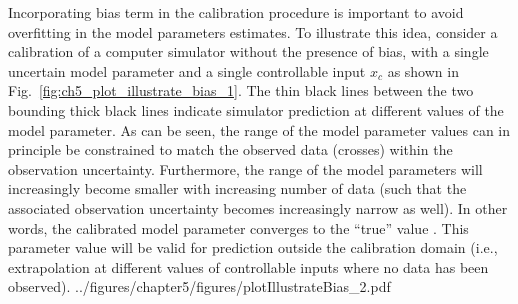 Incorporating bias term in the calibration procedure is important to avoid overfitting in the model parameters estimates.
To illustrate this idea, consider a calibration of a computer simulator without the presence of bias, with a single uncertain model parameter and a single controllable input $x_c$ as shown in Fig.~\ref{fig:ch5_plot_illustrate_bias_1}.
The thin black lines between the two bounding thick black lines indicate simulator prediction at different values of the model parameter.
As can be seen, the range of the model parameter values can in principle be constrained to match the observed data (crosses) within the observation uncertainty.
Furthermore, the range of the model parameters will increasingly become smaller with increasing number of data (such that the associated observation uncertainty becomes increasingly narrow as well).
In other words, the calibrated model parameter converges to the ``true'' value \cite{Bayarri2007,OHagan2013,Brynjarsdottir2014}.
This parameter value will be valid for prediction outside the calibration domain (i.e., extrapolation at different values of controllable inputs where no data has been observed).
{../figures/chapter5/figures/plotIllustrateBias_2.pdf}

